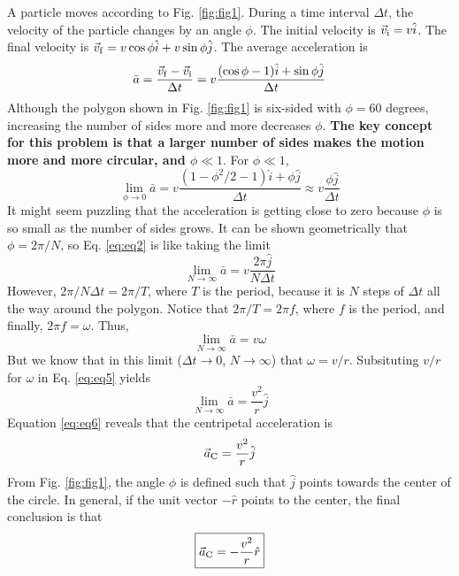 \documentclass[12pt]{article}
\begin{document}
A particle moves according to Fig. \ref{fig:fig1}.  During a time interval $\Delta t$, the velocity of the particle changes by an angle $\phi$.  The initial velocity is $\vec{v}_{\rm i} = v\hat{i}$.  The final velocity is $\vec{v}_{\rm f} = v\cos\phi \hat{i} + v\sin\phi \hat{j}$.  The average acceleration is
\begin{equation}
\bar{a} = \frac{\vec{v}_{\rm f} - \vec{v}_{\rm i}}{\Delta t} = v\frac{(\cos\phi - 1) \hat{i} + \sin\phi \hat{j}}{\Delta t}
\end{equation}
Although the polygon shown in Fig. \ref{fig:fig1} is six-sided with $\phi=60$ degrees, increasing the number of sides more and more decreases $\phi$.  \textbf{The key concept for this problem is that a larger number of sides makes the motion more and more circular, and $\phi\ll1$}.  For $\phi\ll 1$,
\begin{equation}
\lim_{\phi \to 0} \bar{a} = v\frac{(1 - \phi^2/2 - 1) \hat{i} + \phi \hat{j}}{\Delta t} \approx v\frac{\phi \hat{j}}{\Delta t}
\label{eq:eq3}
\end{equation}
It might seem puzzling that the acceleration is getting close to zero because $\phi$ is so small as the number of sides grows.  It can be shown geometrically that $\phi = 2\pi/N$, so Eq. \ref{eq:eq2} is like taking the limit
\begin{equation}
\lim_{N \to \infty} \bar{a} = v\frac{2\pi\hat{j}}{N\Delta t}
\label{eq:eq4}
\end{equation}
However, $2\pi/N\Delta t = 2\pi/T$, where $T$ is the period, because it is $N$ steps of $\Delta t$ all the way around the polygon.  Notice that $2\pi/T = 2\pi f$, where $f$ is the period, and finally, $2\pi f = \omega$.  Thus,
\begin{equation}
\lim_{N \to \infty} \bar{a} = v\omega
\label{eq:eq5}
\end{equation}
But we know that in this limit ($\Delta t \to 0$, $N \to \infty$) that $\omega = v/r$.  Subsituting $v/r$ for $\omega$ in Eq. \ref{eq:eq5} yields
\begin{equation}
\lim_{N \to \infty} \bar{a} = \frac{v^2}{r}\hat{j}
\label{eq:eq6}
\end{equation}
Equation \ref{eq:eq6} reveals that the centripetal acceleration is
\begin{equation}
\vec{a}_{\rm C} = \frac{v^2}{r} \hat{j}
\end{equation}
From Fig. \ref{fig:fig1}, the angle $\phi$ is defined such that $\hat{j}$ points towards the center of the circle.  In general, if the unit vector $-\hat{r}$ points to the center, the final conclusion is that
\begin{equation}
\boxed{\vec{a}_{\rm C} = -\frac{v^2}{r}\hat{r}}
\end{equation}
\end{document}
